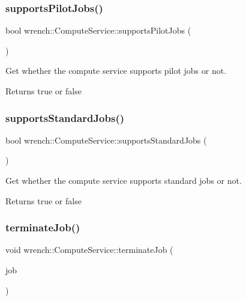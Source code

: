 \subsubsection{\texorpdfstring{supports\+Pilot\+Jobs()}{supportsPilotJobs()}}
{\footnotesize\ttfamily bool wrench\+::\+Compute\+Service\+::supports\+Pilot\+Jobs (\begin{DoxyParamCaption}{ }\end{DoxyParamCaption})}



Get whether the compute service supports pilot jobs or not. 

\begin{DoxyReturn}{Returns}
true or false 
\end{DoxyReturn}
\mbox{\label{classwrench_1_1_compute_service_a0f15f4038c447b0f580b9d2a7bf0cd22}} 
\subsubsection{\texorpdfstring{supports\+Standard\+Jobs()}{supportsStandardJobs()}}
{\footnotesize\ttfamily bool wrench\+::\+Compute\+Service\+::supports\+Standard\+Jobs (\begin{DoxyParamCaption}{ }\end{DoxyParamCaption})}



Get whether the compute service supports standard jobs or not. 

\begin{DoxyReturn}{Returns}
true or false 
\end{DoxyReturn}
\mbox{\label{classwrench_1_1_compute_service_aba97c346fb8f171f17ec09681be37d7f}} 
\subsubsection{\texorpdfstring{terminate\+Job()}{terminateJob()}}
{\footnotesize\ttfamily void wrench\+::\+Compute\+Service\+::terminate\+Job (\begin{DoxyParamCaption}\item[{\hyperlink{classwrench_1_1_workflow_job}{Workflow\+Job} $\ast$}]{job }\end{DoxyParamCaption})}



